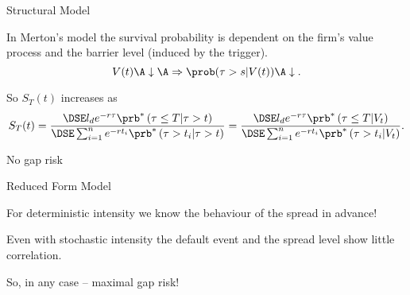{Structural Model}

\item<1-> In Merton's model the survival probability is dependent on the firm's value process and the barrier level (induced by the trigger).
$$
V(t) \A \downarrow \A \Rightarrow \prob(\tau > s |V(t)) \A \downarrow.
$$
\item<2-> So $S_T(t)$ increases as
$$
S_T(t)=\frac{\DSE l_d e^{-r\tau} \prb^*\left(\tau\leq T  | \tau >t\right)} {\DSE\sum_{i=1}^n e^{-rt_i} \prb^*\left(\tau >t_i| \tau >t\right)}
=\frac{\DSE l_d e^{-r\tau} \prb^*\left(\tau\leq T  | V_t \right)} {\DSE\sum_{i=1}^n e^{-rt_i} \prb^*\left(\tau >t_i| V_t\right)}.
$$
\item<3-> No gap risk

{Reduced Form Model}

\item<1->
For deterministic intensity we know the behaviour of the spread  in advance!
\item<2->
Even with stochastic intensity the default event and the spread level show little correlation.
\item<3->  So, in any case  -- maximal gap risk!

